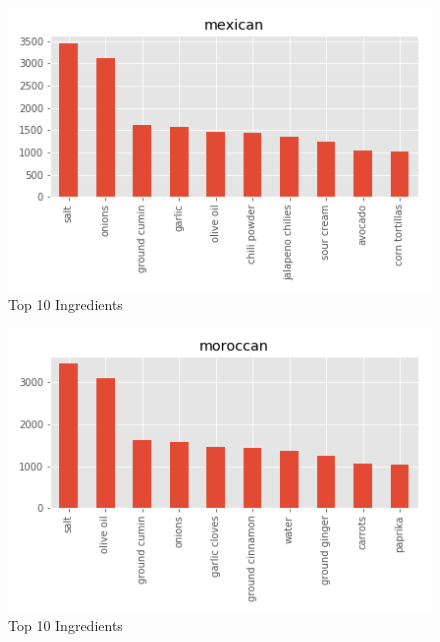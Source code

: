 \documentclass[sigconf]{acmart}
\begin{document}
\begin{figure}[!ht]
  \centering\includegraphics[width=\columnwidth]{images/mexican_10_most_used_ingredients.png}
  \caption{Top 10 Ingredients }\label{f:mexican_10_most_used_ingredients}
\end{figure}

\begin{figure}[!ht]
  \centering\includegraphics[width=\columnwidth]{images/moroccan_10_most_used_ingredients.png}
  \caption{Top 10 Ingredients }\label{f:moroccan_10_most_used_ingredients}
\end{figure}
\end{document}
